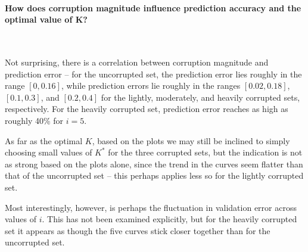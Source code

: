 \paragraph{How does corruption magnitude influence prediction accuracy and the optimal
value of K?}~\smallskip

Not surprising, there is a correlation between corruption magnitude and
prediction error -- for the uncorrupted set, the prediction error lies roughly
in the range $[0, 0.16]$, while prediction errors lie roughly in the ranges
$[0.02, 0.18]$, $[0.1, 0.3]$, and $[0.2, 0.4]$ for the lightly, moderately, and
heavily corrupted sets, respectively. For the heavily corrupted set, prediction
error reaches as high as roughly 40\% for $i = 5$.

As far as the optimal $K$, based on the plots we may still be inclined to simply
choosing small values of $K^*$ for the three corrupted sets, but the indication
is not as strong based on the plots alone, since the trend in the curves seem
flatter than that of the uncorrupted set -- this perhaps applies less so for the
lightly corrupted set.

Most interestingly, however, is perhaps the fluctuation in validation error
across values of $i$. This has not been examined explicitly, but for the heavily
corrupted set it appears as though the five curves stick closer together than
for the uncorrupted set.

\sectend
